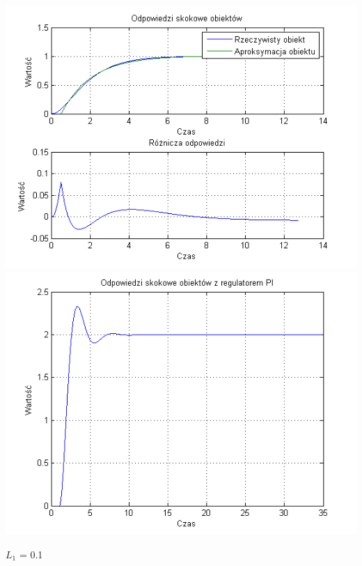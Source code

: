 \documentclass[10pt,a4paper]{article}
\begin{document}
\begin{center}
\includegraphics[scale=1]{images/jeden/skrypt_157.png}\\
\includegraphics[scale=1]{images/jeden/skrypt_158.png}\\
\end{center}
\newpage
$L_1$ = 0.1
\end{document}
